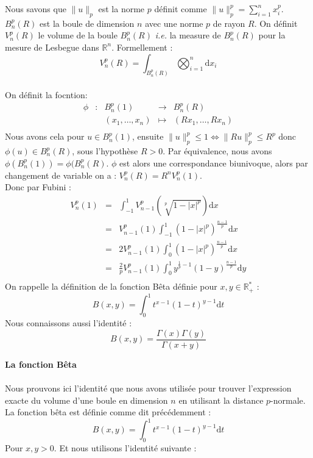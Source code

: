 Nous savons que $\|u\|_p$ est la norme $p$ définit comme $\|u\|_p^p=\sum_{i=1}^n x_i^p$. $B_n^p(R)$ est la boule de dimension $n$ avec une norme $p$ de rayon $R$. On définit $V_n^p(R)$ le volume de la boule $B_n^p(R)$ \textit{i.e.} la measure de $B_n^p(R)$ pour la mesure de Lesbegue dans $\mathbb{R}^n$. Formellement :
\\
\begin{equation*} V_n^p(R) = \int_{B_n^p(R)} \bigotimes_{i=1}^n\mathrm{d}x_i \end{equation*}
\\
On définit la focntion:
\\
\begin{equation*}
\begin{array}{ccccc}
\phi & : & B_n^p(1) & \to & B_n^p(R) \\
& & (x_1, \ldots, x_n) & \mapsto & (Rx_1, \ldots, Rx_n) \\
\end{array}
\end{equation*}
Nous avons cela pour $u\in B_n^p(1)$, ensuite $\|u\|_p^p \leqslant 1 \Longleftrightarrow \|Ru\|_p^p \leqslant R^p$ donc $\phi(u) \in B_n^p(R)$, sous l'hypothèse $R>0$. 
Par équivalence, nous avons $\phi(B_n^p(1)) = \phi(B_n^p(R)$. $\phi$ est alors une correspondance biunivoque, alors par changement de variable on a : $V_n^p(R) = R^nV_n^p(1)$.
\\
Donc par Fubini :
\begin{eqnarray*}
V_n^p(1) &=& \int_{-1}^1 V_{n-1}^p\left(\sqrt[p]{1 - |x|^p}\right)\mathrm{d}x\\
&=& V_{n-1}^p(1) \int_{-1}^1 \left(1-|x|^p\right)^{\frac{n-1}{p}} \mathrm{d}x\\
&=& 2V_{n-1}^p(1) \int_0^1 \left(1-|x|^p\right)^{\frac{n-1}{p}} \mathrm{d}x\\
&=& \frac{2}{p} V_{n-1}^p(1) \int_0^1 y^{\frac{1}{p}-1}(1-y)^{\frac{n-1}{p}}\mathrm{d}y\\
\end{eqnarray*}
On rappelle la définition de la fonction Bêta définie pour $x, y \in \mathbb{R}_+^*$ :
\begin{equation*} B(x, y) = \int_0^1 t^{x-1}(1-t)^{y-1}\mathrm{d}t \end{equation*}
Nous connaissons aussi l'identité :
\begin{equation*} B(x, y) = \frac{\Gamma(x) \Gamma(y)}{\Gamma(x+y)} \end{equation*}

\textbf{La fonction Bêta}
\\
\\
Nous prouvons ici l'identité que nous avons utilisée pour trouver l'expression exacte du volume d'une boule en dimension $n$ en utilisant la distance $p$-normale. La fonction bêta est définie comme dit précédemment :
\\
\begin{equation*} B(x, y) = \int_0^1 t^{x-1}(1-t)^{y-1}\mathrm{d}t \end{equation*}
Pour $x,y > 0$. Et nous utilisons l'identité suivante :

